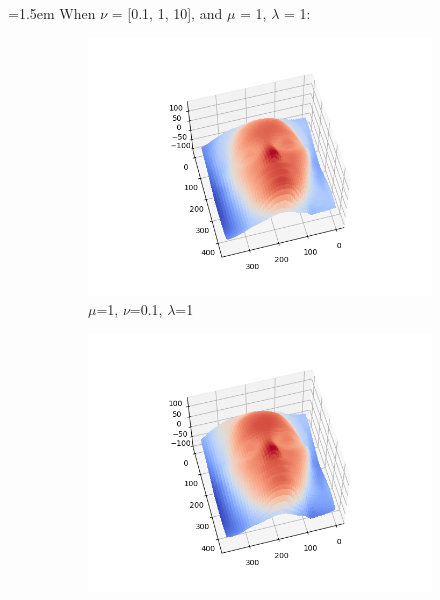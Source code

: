 \documentclass{article}
\begin{document}
	\hangindent=1.5em \hspace{1.5em}When $\nu$ = [0.1, 1, 10], and $\mu$ = 1, $\lambda$ = 1: \\
\begin{figure}[H]
	\centering
	\begin{subfigure}{0.33\textwidth}
		\centering
		\includegraphics[width=\textwidth]{./src/2f_v_change/faceCalibrated_mu_1_v_0.1_lambda_1.png}
		\caption{$\mu$=1, $\nu$=0.1, $\lambda$=1}
	\end{subfigure}
	\hfill
	\begin{subfigure}{0.32\textwidth}
		\centering
		\includegraphics[width=\textwidth]{./src/2f_v_change/faceCalibrated_mu_1_v_1_lambda_1.png}

\end{subfigure}
\end{figure}
\end{document}

